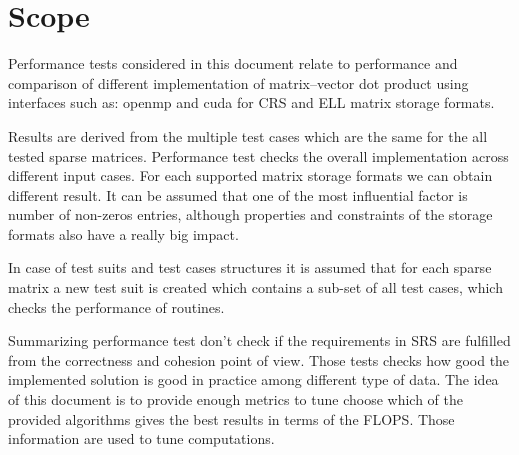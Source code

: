 \section{Scope} \label{s:introduction:scope}
	\begin{comment}
		Identify the test items (software or system) that are the object of testing, e.g., specific attributes of the
		software, the installation instructions, the user instructions, interfacing hardware, database conversion
		software that is not a part of the operational system) including their version/revision level. Also
		identify any procedures for their transfer from other environments to the test environment.
		Supply references to the test item documentation relevant to an individual level of test, if it exists, such
		as follows:
		⎯ Requirements
		⎯ Design
		⎯ User’s guide
		⎯ Operations guide
		⎯ Installation guide
		Reference any Anomaly Reports relating to the test items.
		Identify any items that are to be specifically excluded from testing.
	\end{comment}
	Performance tests considered in this document relate to performance and comparison of different implementation of matrix--vector dot product using interfaces such as: \gls{openmp} and \gls{cuda} for \gls{CRS} and \gls{ELL} matrix storage formats. 
	
	Results are derived from the multiple test cases which are the same for the all tested sparse matrices. Performance test checks the overall implementation across different input cases. For each supported matrix storage formats we can obtain different result. It can be assumed that one of the most influential factor is number of non-zeros entries, although properties and constraints of the storage formats also have a really big impact.
	
	In case of test suits and test cases structures it is assumed that for each sparse matrix a new test suit is created which contains a sub-set of all test cases, which checks the performance of routines.
	
	Summarizing performance test don't check if the requirements in \gls{SRS} are fulfilled from the correctness and cohesion point of view. Those tests checks how good the implemented solution is good in practice among different type of data. The idea of this document is to provide enough metrics to tune choose which of the provided algorithms gives the best results in terms of the \gls{FLOPS}. Those information are used to tune computations.
	
